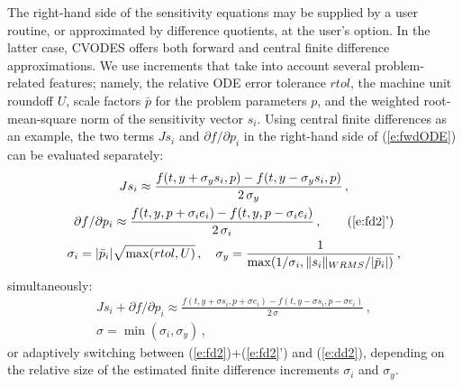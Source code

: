 The right-hand side of the sensitivity equations may be supplied by a 
user routine, or approximated by difference quotients, at the user's option.
In the latter case, CVODES offers both forward and central finite 
difference approximations. 
%
We use increments that take into account several problem-related features;
namely, the relative ODE error tolerance $rtol$, 
the machine unit roundoff $U$,
scale factors $\bar p$ for the problem parameters $p$, 
and the weighted root-mean-square norm of the sensitivity vector $s_i$.
%
Using central finite differences as an example, the two terms $J s_i$ 
and ${\partial f}/{\partial p_i}$ in the right-hand side of (\ref{e:fwdODE}) 
can be evaluated separately:
\begin{gather}
  J s_i \approx \frac{f(t, y+\sigma_y s_i, p)-
    f(t, y-\sigma_y s_i, p)}{2\,\sigma_y} \, , \label{e:fd2} \\
  {\partial f}/{\partial p_i} \approx \frac{f(t,y,p + \sigma_i e_i)-
    f(t,y,p - \sigma_i e_i)}{2\,\sigma_i} \, , \tag{\ref{e:fd2}'} \\
  \sigma_i = |{\bar p}_i| \sqrt{\max(rtol, U)} \, , \quad
  \sigma_y = \frac{1}{\max(1/\sigma_i, \|s_i\|_{WRMS} / |{\bar p}_i|)} \, , \nonumber
\end{gather}
simultaneously:
\begin{gather}
  J s_i + {\partial f}/{\partial p_i} \approx
  \frac{f(t, y+\sigma s_i, p + \sigma e_i) -
    f(t, y-\sigma s_i, p - \sigma e_i)}{2\,\sigma} \, , \label{e:dd2} \\
  \sigma = \min(\sigma_i, \sigma_y) \, , \nonumber
\end{gather}
or adaptively switching between (\ref{e:fd2})+(\ref{e:fd2}') and (\ref{e:dd2}), 
depending on the relative size of the estimated finite difference 
increments $\sigma_i$ and $\sigma_y$.

